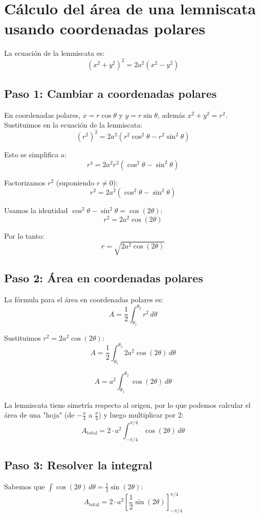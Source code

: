 \section*{Cálculo del área de una lemniscata usando coordenadas polares}

La ecuación de la lemniscata es:
\[
(x^2 + y^2)^2 = 2a^2(x^2 - y^2)
\]

\subsection*{Paso 1: Cambiar a coordenadas polares}

En coordenadas polares, \(x = r\cos\theta\) y \(y = r\sin\theta\), además \(x^2 + y^2 = r^2\). Sustituimos en la ecuación de la lemniscata:
\[
(r^2)^2 = 2a^2(r^2\cos^2\theta - r^2\sin^2\theta)
\]

Esto se simplifica a:
\[
r^4 = 2a^2r^2(\cos^2\theta - \sin^2\theta)
\]

Factorizamos \(r^2\) (suponiendo \(r \neq 0\)):
\[
r^2 = 2a^2(\cos^2\theta - \sin^2\theta)
\]

Usamos la identidad \(\cos^2\theta - \sin^2\theta = \cos(2\theta)\):
\[
r^2 = 2a^2\cos(2\theta)
\]

Por lo tanto:
\[
r = \sqrt{2a^2\cos(2\theta)}
\]

\subsection*{Paso 2: Área en coordenadas polares}

La fórmula para el área en coordenadas polares es:
\[
A = \frac{1}{2} \int_{\theta_1}^{\theta_2} r^2 \, d\theta
\]

Sustituimos \(r^2 = 2a^2\cos(2\theta)\):
\[
A = \frac{1}{2} \int_{\theta_1}^{\theta_2} 2a^2\cos(2\theta) \, d\theta
\]

\[
A = a^2 \int_{\theta_1}^{\theta_2} \cos(2\theta) \, d\theta
\]

La lemniscata tiene simetría respecto al origen, por lo que podemos calcular el área de una "hoja" (de \(-\frac{\pi}{4}\) a \(\frac{\pi}{4}\)) y luego multiplicar por 2:
\[
A_{\text{total}} = 2 \cdot a^2 \int_{-\pi/4}^{\pi/4} \cos(2\theta) \, d\theta
\]

\subsection*{Paso 3: Resolver la integral}

Sabemos que \(\int \cos(2\theta) \, d\theta = \frac{1}{2} \sin(2\theta)\):
\[
A_{\text{total}} = 2 \cdot a^2 \left[ \frac{1}{2} \sin(2\theta) \right]_{-\pi/4}^{\pi/4}
\]

